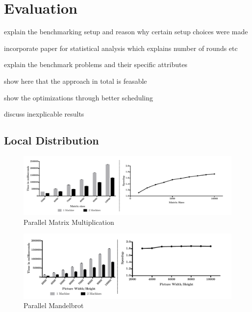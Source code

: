 \chapter{Evaluation}



explain the benchmarking setup and reason why certain setup choices were made

incorporate paper for statistical analysis which explains number of rounds etc

explain the benchmark problems and their specific attributes

show here that the approach in total is feasable

show the optimizations through better scheduling

discuss inexplicable results

\section{Local Distribution}

\begin{figure}[H]
	
	\includegraphics[width=1.0\textwidth]{images/sharded_matrix_multi.pdf}
	\centering
	\caption{Parallel Matrix Multiplication}
	\label{img:parallel_matrix}
\end{figure}


\begin{figure}[H]
	
	\includegraphics[width=1.0\textwidth]{images/sharded_mandelbrot.pdf}
	\centering
	\caption{Parallel Mandelbrot}
	\label{img:parallel_mandelbrot}
\end{figure}
